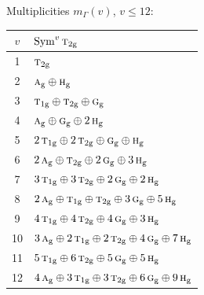 \documentclass[11pt]{article}
\newcommand{\irr}[1]{\text{\normalfont\scshape #1}}
\newcommand{\ptag}[1]{\mathrm{#1}}
\begin{document}
Multiplicities $m_\Gamma(v)$, $v\le12$:
\begin{longtable}{c l}\hline $v$ & $\operatorname{Sym}^{v}\irr{t}_{2\ptag{g}}$\\ \hline\endhead
1 & $\irr{t}_{2\ptag{g}}$\\
2 & $\irr{a}_{\ptag{g}}\oplus \irr{h}_{\ptag{g}}$\\
3 & $\irr{t}_{1\ptag{g}}\oplus \irr{t}_{2\ptag{g}}\oplus \irr{g}_{\ptag{g}}$\\
4 & $\irr{a}_{\ptag{g}}\oplus \irr{g}_{\ptag{g}}\oplus 2\,\irr{h}_{\ptag{g}}$\\
5 & $2\,\irr{t}_{1\ptag{g}}\oplus 2\,\irr{t}_{2\ptag{g}}\oplus \irr{g}_{\ptag{g}}\oplus \irr{h}_{\ptag{g}}$\\
6 & $2\,\irr{a}_{\ptag{g}}\oplus \irr{t}_{2\ptag{g}}\oplus 2\,\irr{g}_{\ptag{g}}\oplus 3\,\irr{h}_{\ptag{g}}$\\
7 & $3\,\irr{t}_{1\ptag{g}}\oplus 3\,\irr{t}_{2\ptag{g}}\oplus 2\,\irr{g}_{\ptag{g}}\oplus 2\,\irr{h}_{\ptag{g}}$\\
8 & $2\,\irr{a}_{\ptag{g}}\oplus \irr{t}_{1\ptag{g}}\oplus \irr{t}_{2\ptag{g}}\oplus 3\,\irr{g}_{\ptag{g}}\oplus 5\,\irr{h}_{\ptag{g}}$\\
9 & $4\,\irr{t}_{1\ptag{g}}\oplus 4\,\irr{t}_{2\ptag{g}}\oplus 4\,\irr{g}_{\ptag{g}}\oplus 3\,\irr{h}_{\ptag{g}}$\\
10 & $3\,\irr{a}_{\ptag{g}}\oplus 2\,\irr{t}_{1\ptag{g}}\oplus 2\,\irr{t}_{2\ptag{g}}\oplus 4\,\irr{g}_{\ptag{g}}\oplus 7\,\irr{h}_{\ptag{g}}$\\
11 & $5\,\irr{t}_{1\ptag{g}}\oplus 6\,\irr{t}_{2\ptag{g}}\oplus 5\,\irr{g}_{\ptag{g}}\oplus 5\,\irr{h}_{\ptag{g}}$\\
12 & $4\,\irr{a}_{\ptag{g}}\oplus 3\,\irr{t}_{1\ptag{g}}\oplus 3\,\irr{t}_{2\ptag{g}}\oplus 6\,\irr{g}_{\ptag{g}}\oplus 9\,\irr{h}_{\ptag{g}}$\\
\hline\end{longtable}
\end{document}
